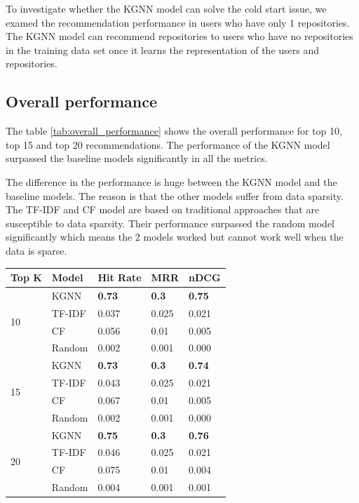 \documentclass[11pt,twoside]{report}
\begin{document}
To investigate whether the KGNN model can solve the cold start issue, we examed the recommendation performance in users who have only 1 repositories. The KGNN model can recommend repositories to users who have no repositories in the training data set once it learns the representation of the users and repositories.

\subsection{Overall performance}
The table \ref{tab:overall_performance} shows the overall performance for top 10, top 15 and top 20 recommendations. The performance of the KGNN model surpassed the baseline models significantly in all the metrics.

The difference in the performance is huge between the KGNN model and the baseline models. The reason is that the other models suffer from data sparsity. The TF-IDF and CF model are based on traditional approaches that are susceptible to data sparsity. Their performance surpassed the random model significantly which means the 2 models worked but cannot work well when the data is sparse.

\begin{center}
    \begin{tabular}{l | l | l | l | l}
    \hline
    Top K & Model & Hit Rate & MRR & nDCG \\
    \hline
    \multirow{4}{*}{10} 
    & KGNN & \textbf{0.73} & \textbf{0.3} & \textbf{0.75} \\
    & TF-IDF & 0.037 & 0.025 & 0.021 \\
    & CF & 0.056 & 0.01 & 0.005 \\
    & Random & 0.002 & 0.001 & 0.000 \\
    \hline
    \multirow{4}{*}{15}
    & KGNN & \textbf{0.73} & \textbf{0.3} & \textbf{0.74} \\
    & TF-IDF & 0.043 & 0.025 & 0.021 \\
    & CF & 0.067 & 0.01 & 0.005 \\
    & Random & 0.002 & 0.001 & 0.000 \\
    \hline
    \multirow{4}{*}{20}
    & KGNN & \textbf{0.75} & \textbf{0.3} & \textbf{0.76} \\
    & TF-IDF & 0.046 & 0.025 & 0.021 \\
    & CF & 0.075 & 0.01 & 0.004 \\
    & Random & 0.004 & 0.001 & 0.001 \\
    \end{tabular}
    \label{tab:overall_performance}
\end{center}
\end{document}
